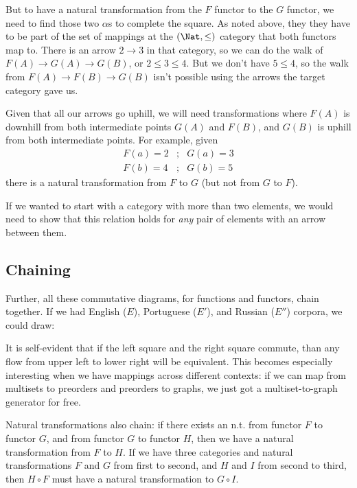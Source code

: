 \documentclass[11pt]{article}
\begin{document}
But to have a natural transformation from the $F$ functor to the $G$ functor, we need
to find those two $\alpha$s to complete the square. As noted above, they
they have to be part of the set of mappings at the $(\Nat, \leq)$ category that both
functors map to. There is an arrow $2\to 3$ in that category, so we can do the walk
of $F(A) \to G(A) \to G(B)$, or $2 \leq 3 \leq 4$.  But we don't have $5\leq 4$,
so the walk from $F(A)\to F(B) \to G(B)$ isn't possible using the arrows the target
category gave us.

Given that all our arrows go uphill, we will need transformations where $F(A)$ is downhill
from both intermediate points $G(A)$ and $F(B)$, and $G(B)$ is uphill from both
intermediate points. For example, given
\begin{eqnarray*}
    F(a) = 2 &;& G(a) = 3\\
    F(b) = 4 &;& G(b) = 5
\end{eqnarray*} 
there is a natural transformation from $F$ to $G$ (but not from $G$ to $F$).

If we wanted to start with a category with more than two elements, we would need to show
that this relation holds for {\em any} pair of elements with an arrow between them.

\subsection{Chaining}
Further, all these commutative diagrams, for functions and functors, chain together. If
we had English ($E$), Portuguese ($E'$), and Russian  ($E''$) corpora, we could draw:


It is self-evident that if the left square and the right square commute, than any flow
from upper left to lower right will be equivalent. This becomes especially interesting
when we have mappings across different contexts: if we can map from multisets to preorders
and preorders to graphs, we just got a multiset-to-graph generator for free.

Natural transformations also chain: if there exists an n.t. from functor $F$ to functor
$G$, and from functor $G$ to functor $H$, then we have a natural transformation from $F$
to $H$. If we have three categories and natural transformations $F$ and $G$ from first to
second, and $H$ and $I$ from second to third, then $H\circ F$ must have a natural
transformation to $G\circ I$.
\end{document}
